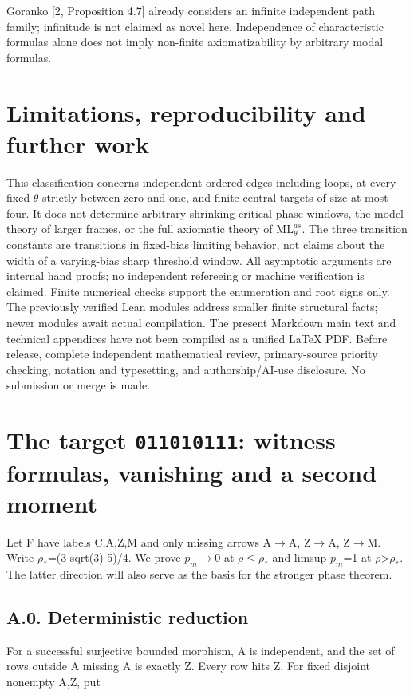 \documentclass[11pt]{article}
\begin{document}
Goranko [2, Proposition 4.7] already considers an infinite independent path family; infinitude is not claimed as novel here. Independence of characteristic formulas alone does not imply non-finite axiomatizability by arbitrary modal formulas.

\section{Limitations, reproducibility and further work}

This classification concerns independent ordered edges including loops, at every fixed $\theta$ strictly between zero and one, and finite central targets of size at most four. It does not determine arbitrary shrinking critical-phase windows, the model theory of larger frames, or the full axiomatic theory of $\mathrm{ML}^{as}_\theta$. The three transition constants are transitions in fixed-bias limiting behavior, not claims about the width of a varying-bias sharp threshold window. All asymptotic arguments are internal hand proofs; no independent refereeing or machine verification is claimed. Finite numerical checks support the enumeration and root signs only. The previously verified Lean modules address smaller finite structural facts; newer modules await actual compilation. The present Markdown main text and technical appendices have not been compiled as a unified LaTeX PDF. Before release, complete independent mathematical review, primary-source priority checking, notation and typesetting, and authorship/AI-use disclosure. No submission or merge is made.


\appendix
\section{The target \texttt{011010111}: witness formulas, vanishing and a second moment}

Let F have labels C,A,Z,M and only missing arrows A\ensuremath{\to}A, Z\ensuremath{\to}A, Z\ensuremath{\to}M. Write $\rho_{*}$=(3 sqrt(3)-5)/4. We prove $p_m$\ensuremath{\to}0 at $\rho$\ensuremath{\leq}$\rho_{*}$ and limsup $p_m$=1 at $\rho$>$\rho_{*}$. The latter direction will also serve as the basis for the stronger phase theorem.

\subsection*{A.0. Deterministic reduction}

For a successful surjective bounded morphism, A is independent, and the set of rows outside A missing A is exactly Z. Every row hits Z. For fixed disjoint nonempty A,Z, put
\end{document}
